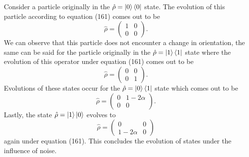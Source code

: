 \documentclass[twocolumn]{article}
\begin{document}
Consider a particle originally in the $\hat{\rho}=\ket{0}\bra{0}$ state. The evolution of this particle according to equation (161) comes out to be
\begin{equation}
\hat{\rho}=
\begin{pmatrix}
1 & 0 \\
0 & 0
\end{pmatrix}.
\end{equation}
We can observe that this particle does not encounter a change in orientation, the same can be said for the particle originally in the $\hat{\rho}=\ket{1}\bra{1}$ state where the evolution of this operator under equation (161) comes out to be
\begin{equation}
\hat{\rho}=
\begin{pmatrix}
0 & 0 \\
0 & 1
\end{pmatrix}.
\end{equation}
Evolutions of these states occur for the $\hat{\rho}=\ket{0}\bra{1}$ state which comes out to be
\begin{equation}
\hat{\rho}=
\begin{pmatrix}
0 & 1-2\alpha \\
0 & 0
\end{pmatrix}.
\end{equation}
Lastly, the state $\hat{\rho}=\ket{1}\ket{0}$ evolves to 
\begin{equation}
\hat{\rho}=
\begin{pmatrix}
0 & 0 \\
1-2\alpha & 0
\end{pmatrix}
\end{equation}
again under equation (161). This concludes the evolution of states under the influence of noise.
\end{document}
